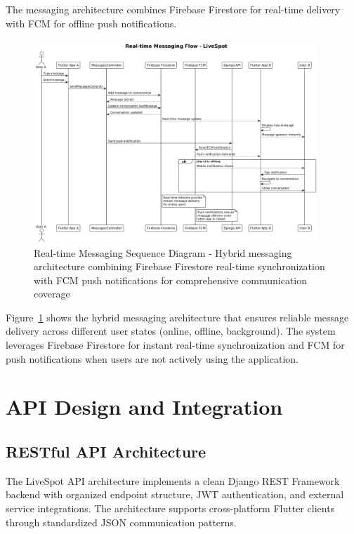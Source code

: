The messaging architecture combines Firebase Firestore for real-time delivery with FCM for offline push notifications.

\begin{figure}[h!]
    \centering
    \includegraphics[width=0.95\textwidth]{figures/messaging_sequence}
    \caption{Real-time Messaging Sequence Diagram - Hybrid messaging architecture combining Firebase Firestore real-time synchronization with FCM push notifications for comprehensive communication coverage}
    \label{fig:messaging_sequence}
\end{figure}

Figure~\ref{fig:messaging_sequence} shows the hybrid messaging architecture that ensures reliable message delivery across different user states (online, offline, background). The system leverages Firebase Firestore for instant real-time synchronization and FCM for push notifications when users are not actively using the application.

\section{API Design and Integration}
\label{sec:api_design}

\subsection{RESTful API Architecture}

The LiveSpot API architecture implements a clean Django REST Framework backend with organized endpoint structure, JWT authentication, and external service integrations. The architecture supports cross-platform Flutter clients through standardized JSON communication patterns.

